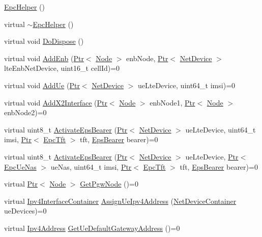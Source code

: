 \begin{DoxyCompactItemize}
\item 
\hyperlink{classns3_1_1EpcHelper_a419929e12a2c6273eb48cb766064436b}{Epc\+Helper} ()
\item 
virtual \hyperlink{classns3_1_1EpcHelper_a182aa08f503d0473cace96c896eeed89}{$\sim$\+Epc\+Helper} ()
\item 
virtual void \hyperlink{classns3_1_1EpcHelper_a6c1962f072e55196ad97df418892b135}{Do\+Dispose} ()
\item 
virtual void \hyperlink{classns3_1_1EpcHelper_a0f715f9593ea99e7aa8fa56ed57de6dc}{Add\+Enb} (\hyperlink{classns3_1_1Ptr}{Ptr}$<$ \hyperlink{classns3_1_1Node}{Node} $>$ enb\+Node, \hyperlink{classns3_1_1Ptr}{Ptr}$<$ \hyperlink{classns3_1_1NetDevice}{Net\+Device} $>$ lte\+Enb\+Net\+Device, uint16\+\_\+t cell\+Id)=0
\item 
virtual void \hyperlink{classns3_1_1EpcHelper_a900681efc6663ad4bc5f9d3aedd1a6ef}{Add\+Ue} (\hyperlink{classns3_1_1Ptr}{Ptr}$<$ \hyperlink{classns3_1_1NetDevice}{Net\+Device} $>$ ue\+Lte\+Device, uint64\+\_\+t imsi)=0
\item 
virtual void \hyperlink{classns3_1_1EpcHelper_a69497cfb457e8b44cb0f21b56bcaae34}{Add\+X2\+Interface} (\hyperlink{classns3_1_1Ptr}{Ptr}$<$ \hyperlink{classns3_1_1Node}{Node} $>$ enb\+Node1, \hyperlink{classns3_1_1Ptr}{Ptr}$<$ \hyperlink{classns3_1_1Node}{Node} $>$ enb\+Node2)=0
\item 
virtual uint8\+\_\+t \hyperlink{classns3_1_1EpcHelper_afb58872b560ccfaf012419990185069c}{Activate\+Eps\+Bearer} (\hyperlink{classns3_1_1Ptr}{Ptr}$<$ \hyperlink{classns3_1_1NetDevice}{Net\+Device} $>$ ue\+Lte\+Device, uint64\+\_\+t imsi, \hyperlink{classns3_1_1Ptr}{Ptr}$<$ \hyperlink{classns3_1_1EpcTft}{Epc\+Tft} $>$ tft, \hyperlink{structns3_1_1EpsBearer}{Eps\+Bearer} bearer)=0
\item 
virtual uint8\+\_\+t \hyperlink{classns3_1_1EpcHelper_ae40cb48539bb7f3bac84282851a5c341}{Activate\+Eps\+Bearer} (\hyperlink{classns3_1_1Ptr}{Ptr}$<$ \hyperlink{classns3_1_1NetDevice}{Net\+Device} $>$ ue\+Lte\+Device, \hyperlink{classns3_1_1Ptr}{Ptr}$<$ \hyperlink{classns3_1_1EpcUeNas}{Epc\+Ue\+Nas} $>$ ue\+Nas, uint64\+\_\+t imsi, \hyperlink{classns3_1_1Ptr}{Ptr}$<$ \hyperlink{classns3_1_1EpcTft}{Epc\+Tft} $>$ tft, \hyperlink{structns3_1_1EpsBearer}{Eps\+Bearer} bearer)=0
\item 
virtual \hyperlink{classns3_1_1Ptr}{Ptr}$<$ \hyperlink{classns3_1_1Node}{Node} $>$ \hyperlink{classns3_1_1EpcHelper_a5df840eab9ce83c2e1315a315c5161f1}{Get\+Pgw\+Node} ()=0
\item 
virtual \hyperlink{classns3_1_1Ipv4InterfaceContainer}{Ipv4\+Interface\+Container} \hyperlink{classns3_1_1EpcHelper_a1184afcb5823f2a3ed62fc7f2a7fdc7e}{Assign\+Ue\+Ipv4\+Address} (\hyperlink{classns3_1_1NetDeviceContainer}{Net\+Device\+Container} ue\+Devices)=0
\item 
virtual \hyperlink{classns3_1_1Ipv4Address}{Ipv4\+Address} \hyperlink{classns3_1_1EpcHelper_aeec86083ad346813d44b261616333594}{Get\+Ue\+Default\+Gateway\+Address} ()=0
\end{DoxyCompactItemize}
